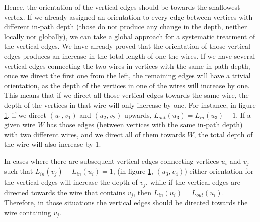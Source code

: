 \documentclass[12pt, twoside, openany]{book}
\begin{document}
Hence, the orientation of the vertical edges should be towards the shallowest vertex. If we already assigned an orientation to every edge between vertices with different in-path depth (those do not produce any change in the depth, neither locally nor globally), we can take a global approach for a systematic treatment of the vertical edges. We have already proved that the orientation of those vertical edges produces an increase in the total length of one the wires. If we have several vertical edges connecting the two wires in vertices with the same in-path depth, once we direct the first one from the left, the remaining edges will have a trivial orientation, as the depth of the vertices in one of the wires will increase by one. This means that if we direct all those vertical edges towards the same wire, the depth of the vertices in that wire will only increase by one. For instance, in figure \ref{fig:graph_algorithm}, if we direct $(u_1, v_1)$ and $(u_2, v_2)$ upwards, $L_{out}(u_3) = L_{in}(u_3) + 1$. If a given wire $W$ has those edges (between vertices with the same in-path depth) with two different wires, and we direct all of them towards $W$, the total depth of the wire will also increase by 1.

\begin{figure} [ht]
    \centering
    
    \caption{}
    \label{fig:graph_algorithm}
\end{figure}

In cases where there are subsequent vertical edges connecting vertices $u_i$ and $v_j$ such that $L_{in}(v_j) - L_{in}(u_i) = 1$, (in figure \ref{fig:graph_algorithm}, $(u_3, v_4)$) either orientation for the vertical edges will increase the depth of $v_j$, while if the vertical edges are directed towards the wire that contains $v_j$, then $L_{in}(u_i) = L_{out}(u_i)$. Therefore, in those situations the vertical edges should be directed towards the wire containing $v_j$. 
\end{document}
